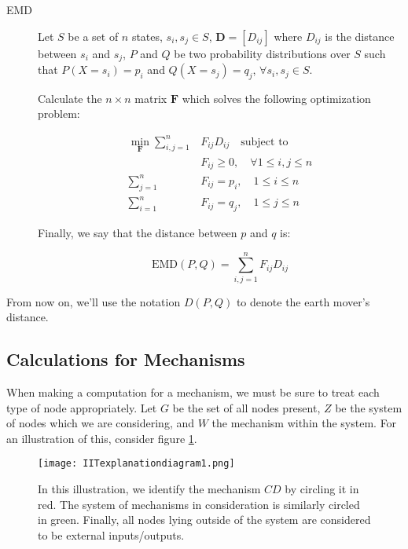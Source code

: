 \begin{description}
	\item[EMD] Let $S$ be a set of $n$ states, $s_i, s_j \in S$, $\mathbf{D} = \left[ D_{ij}\right]$ where $D_{ij}$ is the distance between $s_i$ and $s_j$, $P$ and $Q$ be two probability distributions over $S$ such that $P(X = s_i) = p_i$ and $Q(X=s_j) = q_j$, $\forall s_i, s_j \in S$. 
	
	Calculate the $n\times n$ matrix $\mathbf{F}$ which solves the following optimization problem:
	
	\begin{align}
	\label{eq:EMD1}
	\min \limits_{\mathbf{F}}\sum \limits_{i,j=1}^n &F_{ij} D_{ij}\quad \text{subject to}\\
	&F_{ij}\geq 0,\quad \forall 1 \leq i,j \leq n\\
	\sum \limits_{j=1}^n &F_{ij} = p_i,\quad 1 \leq i \leq n\\
	\sum \limits_{i=1}^n &F_{ij} = q_j,\quad 1 \leq j \leq n
	\end{align}
	
	Finally, we say that the distance between $p$ and $q$ is: 
	
	\begin{equation}
	\label{def:EMD}
	\text{EMD}(P, Q) = \sum \limits_{i,j=1}^{n} F_{ij} D_{ij}
	\end{equation}
\end{description}

From now on, we'll use the notation $D(P,Q)$ to denote the earth mover's distance.

\subsection{Calculations for Mechanisms}\label{sec:little_phi}
When making a computation for a mechanism, we must be sure to treat each type of node appropriately. Let $G$ be the set of all nodes present, $Z$ be the system of nodes which we are considering, and $W$ the mechanism within the system. For an illustration of this, consider figure \ref{fig:IIT_illustration1}.

\begin{figure}[ht]
	\centering
	
	\texttt{[image: IITexplanationdiagram1.png]}
	\caption{In this illustration, we identify the mechanism $CD$ by circling it in red. The system of mechanisms in consideration is similarly circled in green. Finally, all nodes lying outside of the system are considered to be external inputs/outputs.}
	\label{fig:IIT_illustration1}
\end{figure}


